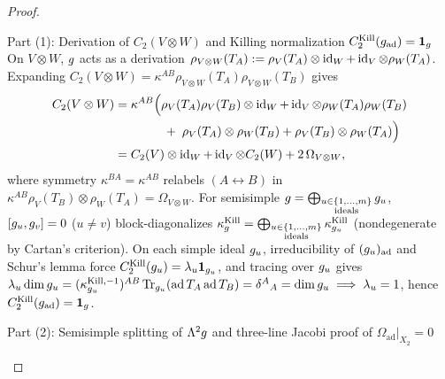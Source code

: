 \begin{proof}\leavevmode
\begin{proofpart}{Part (1): Derivation of $C_2(V\otimes W)$ and Killing normalization $C_2^{\mathrm{Kill}}(g_{\mathrm{ad}}) = \mathbf{1}_{g}$}
On $V\otimes W$, $g$ acts as a derivation $\rho_{V\otimes W}(T_A) := \rho_V(T_A)\otimes\operatorname{id}_W + \operatorname{id}_V\otimes\rho_W(T_A)$. Expanding $C_2(V\otimes W) = \kappa^{AB}\rho_{V\otimes W}(T_A)\rho_{V\otimes W}(T_B)$ gives
\[
\begin{aligned}
C_2(V\otimes W) &= \kappa^{AB}\Bigl(\rho_V(T_A)\rho_V(T_B)\otimes\operatorname{id}_W + \operatorname{id}_V\otimes\rho_W(T_A)\rho_W(T_B)\\
&\qquad\qquad +\; \rho_V(T_A)\otimes\rho_W(T_B) + \rho_V(T_B)\otimes\rho_W(T_A)\Bigr)\\
&= C_2(V)\otimes\operatorname{id}_W + \operatorname{id}_V\otimes C_2(W) + 2\,\Omega_{V\otimes W},
\end{aligned}
\]
where symmetry $\kappa^{BA} = \kappa^{AB}$ relabels $(A\leftrightarrow B)$ in $\kappa^{AB}\rho_V(T_B)\otimes\rho_W(T_A) = \Omega_{V\otimes W}$. For semisimple $g = \bigoplus_{\substack{u\in\{1,\dots,m\}\\\mathrm{ideals}}}g_u$, $[g_u,g_v] = 0$ ($u\neq v$) block-diagonalizes $\kappa^{\mathrm{Kill}}_{g} = \bigoplus_{\substack{u\in\{1,\dots,m\}\\\mathrm{ideals}}}\kappa^{\mathrm{Kill}}_{g_u}$ (nondegenerate by Cartan's criterion). On each simple ideal $g_u$, irreducibility of $(g_u)_{\mathrm{ad}}$ and Schur's lemma force $C_2^{\mathrm{Kill}}(g_u) = \lambda_u\mathbf{1}_{g_u}$, and tracing over $g_u$ gives $\lambda_u\dim g_u = (\kappa_{g_u}^{\mathrm{Kill},-1})^{AB}\operatorname{Tr}_{g_u}(\operatorname{ad} T_A\operatorname{ad} T_B) = \delta^A{}_A = \dim g_u \implies \lambda_u = 1$, hence $C_2^{\mathrm{Kill}}(g_{\mathrm{ad}}) = \mathbf{1}_{g}$.
\end{proofpart}
\begin{proofpart}{Part (2): Semisimple splitting of $\Lambda^2g$ and three-line Jacobi proof of $\Omega_{\mathrm{ad}}|_{X_2} = 0$}

\end{proofpart}
\end{proof}
